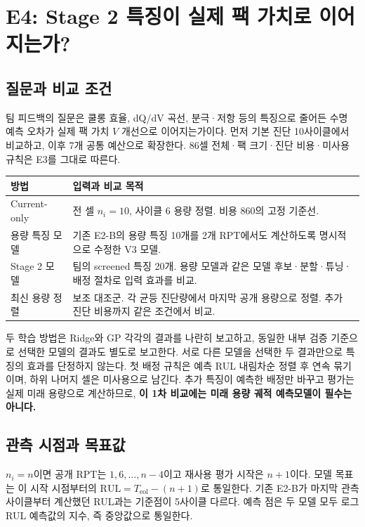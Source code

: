 \clearpage
\section{E4: Stage 2 특징이 실제 팩 가치로 이어지는가?}

\subsection*{질문과 비교 조건}
팀 피드백의 질문은 쿨롱 효율, dQ/dV 곡선, 분극·저항 등의 특징으로 줄어든 수명 예측 오차가 실제 팩 가치 $V$ 개선으로 이어지는가이다. 먼저 기본 진단 10사이클에서 비교하고, 이후 7개 공통 예산으로 확장한다. 86셀 전체·팩 크기·진단 비용·미사용 규칙은 E3를 그대로 따른다.

\begin{center}
\begin{tabular}{p{.21\linewidth}p{.68\linewidth}}
\toprule
방법 & 입력과 비교 목적 \\
\midrule
Current-only & 전 셀 $n_i=10$, 사이클 6 용량 정렬. 비용 860의 고정 기준선. \\
용량 특징 모델 & 기존 E2-B의 용량 특징 10개를 2개 RPT에서도 계산하도록 명시적으로 수정한 V3 모델. \\
Stage 2 모델 & 팀의 screened 특징 20개. 용량 모델과 같은 모델 후보·분할·튜닝·배정 절차로 입력 효과를 비교. \\
최신 용량 정렬 & 보조 대조군. 각 균등 진단량에서 마지막 공개 용량으로 정렬. 추가 진단 비용까지 같은 조건에서 비교. \\
\bottomrule
\end{tabular}
\end{center}

두 학습 방법은 Ridge와 GP 각각의 결과를 나란히 보고하고, 동일한 내부 검증 기준으로 선택한 모델의 결과도 별도로 보고한다. 서로 다른 모델을 선택한 두 결과만으로 특징의 효과를 단정하지 않는다. 첫 배정 규칙은 예측 RUL 내림차순 정렬 후 연속 묶기이며, 하위 나머지 셀은 미사용으로 남긴다. 추가 특징이 예측한 배정만 바꾸고 평가는 실제 미래 용량으로 계산하므로, \textbf{이 1차 비교에는 미래 용량 궤적 예측모델이 필수는 아니다.}

\subsection*{관측 시점과 목표값}
$n_i=n$이면 공개 RPT는 $1,6,\ldots,n-4$이고 재사용 평가 시작은 $n+1$이다. 모델 목표는 이 시작 시점부터의 $\mathrm{RUL}=T_{\mathrm{eol}}-(n+1)$로 통일한다. 기존 E2-B가 마지막 관측 사이클부터 계산했던 RUL과는 기준점이 5사이클 다르다. 예측 점은 두 모델 모두 로그 RUL 예측값의 지수, 즉 중앙값으로 통일한다.

